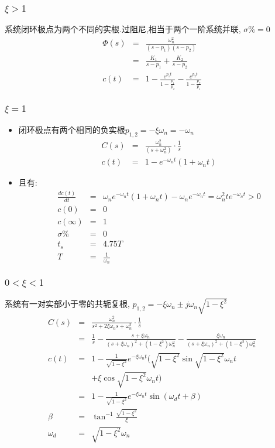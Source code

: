 \documentclass{article}
\begin{document}
\begin{frame}
\frametitle{$\xi>1$}
\label{sec-1-2-3}

    系统闭环极点为两个不同的实根.过阻尼,相当于两个一阶系统并联, $\sigma\%=0$
       \begin{eqnarray*}
       \Phi(s) & = & \frac{\omega_n^2}{(s-p_1)(s-p_2)} \\
	       & = & \frac{K_1}{s-p_1}+\frac{K_2}{s-p_2}\\
       c(t)    &=& 1-\frac{e^{p_1 t}}{1-\frac{p_1}{p_2}}-\frac{e^{p_2 t}}{1-\frac{p_2}{p_1}}
       \end{eqnarray*}
\end{frame}
\begin{frame}
\frametitle{$\xi=1$}
\label{sec-1-2-4}

\begin{itemize}
\item <1-> 闭环极点有两个相同的负实根$p_{1,2}=-\xi\omega_n=-\omega_n$
       \begin{eqnarray*}
       C(s) & = &\frac{\omega_n^2}{(s+\omega_n^2)}\cdot\frac{1}{s} \\
       c(t) &=& 1-e^{-\omega_n t}(1+\omega_n t)
       \end{eqnarray*}
\item <2-> 且有:
       \begin{eqnarray*}
       \frac{dc(t)}{dt} &=& \omega_ne^{-\omega_n t}(1+\omega_n t)-\omega_n e^{-\omega_n t}
       	=  \omega_n^2 te^{-\omega_n t} 
       	>  0 \\
       c(0) &=&0 \\
       c(\infty)&=&1\\
       \sigma \% &=& 0\\
       t_s &=& 4.75T \\
       T &=&\frac{1}{\omega_n}
       \end{eqnarray*}
\end{itemize}
\end{frame}
\begin{frame}
\frametitle{$0<\xi<1$}
\label{sec-1-2-5}

   系统有一对实部小于零的共轭复根, $p_{1,2}  =  -\xi\omega_n\pm j\omega_n\sqrt{1-\xi^2}$
\begin{eqnarray*}
C(s) &=& \frac{\omega_n^2}{s^2+2\xi\omega_n s+\omega_n^2}\cdot\frac{1}{s} \\
     &=& \frac{1}{s}-\frac{s+\xi\omega_n}{(s+\xi\omega_n)^2+(1-\xi^2)\omega_n^2}-\frac{\xi\omega_n}{(s+\xi\omega_n)^2+(1-\xi^2)\omega_n^2} \\
c(t) &=& 1-\frac{1}{\sqrt{1-\xi^2}}e^{-\xi\omega_n t}(\sqrt{1-\xi^2}\sin\sqrt{1-\xi^2}\omega_n t \\
     & &+\xi\cos\sqrt{1-\xi^2}\omega_n t)\\
     &=& 1-\frac{1}{\sqrt{1-\xi^2}}e^{-\xi\omega_n t}\sin(\omega_d t+\beta)\\
\beta & = & \tan^{-1}\frac{\sqrt{1-\xi^2}}{\xi} \\
\omega_d &=& \sqrt{1-\xi^2}\omega_n
\end{eqnarray*}
\end{frame}
\end{document}
